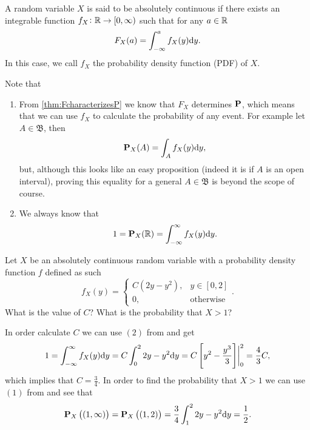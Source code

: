 \documentclass[11pt,a4paper]{article}
\begin{document}
\begin{definition}
  A random variable $X$ is said to be absolutely continuous if there
  exists an integrable function $f_X \colon \mathbb{R} \to [0,\infty)$
  such that for any $a \in \mathbb{R}$
  \[
    F_X(a) = \int_{-\infty}^{a} f_X(y) \dy.
  \]
  In this case, we call $f_X$ the probability density function (PDF) of $X$.
\end{definition}

\begin{remark}
  \label{rmk:pdf-properties}
  Note that
  \begin{enumerate}
    \item[(1)] From \autoref{thm:FcharacterizesP} we know that $F_X$
      determines $\mathbf{P}$, which means that we can use $f_X$
      to calculate the probability of any event.
      For example let $A \in \mathfrak B$, then
      \[
        \Prob_X(A) = \int_{A} f_X(y) \dy,
      \]
      but, although this looks like an easy proposition
      (indeed it is if $A$ is an open interval),
      proving this equality for a general $A \in \mathfrak B$
      is beyond the scope of course.
    \item[(2)] We always know that
      \[
        1 = \Prob_X(\R) = \int_{-\infty}^{\infty} f_X(y) \dy.
      \]
  \end{enumerate}
\end{remark}

\begin{exercise}
  Let $X$ be an absolutely continuous random variable with a probability
  density function $f$ defined as such
  \[
    f_X(y) =
    \begin{cases}
      C(2y - y^2), &y \in [0,2] \\
      0, &\text{otherwise}
    \end{cases}.
  \]
  What is the value of $C$? What is the probability that $X > 1$?
\end{exercise}
\begin{solution}
  In order calculate $C$ we can use $(2)$ from 
  and get
  \[
    1 =
    \int_{-\infty}^{\infty} f_X(y) \dy =
    C \int_{0}^{2} 2y - y^2 \dy =
    C\left[y^2 - \frac{y^3}{3}\right]\biggr\vert_{0}^{2} =
    \frac{4}{3} C,
  \]
  which implies that $C = \frac{3}{4}$.
  In order to find the probability that $X > 1$
  we can use $(1)$ from  and see that
  \[
    \Prob_X\left((1,\infty)\right) =
    \Prob_X\left((1,2)\right) =
    \frac{3}{4} \int_{1}^{2} 2y - y^2 \dy =
    \frac{1}{2}.
  \]
\end{solution}
\end{document}
